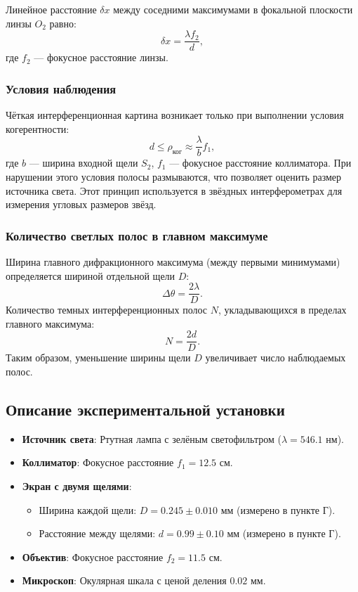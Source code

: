 Линейное расстояние $\delta x$ между соседними максимумами в фокальной плоскости линзы $O_2$ равно:  
\[
\delta x = \frac{\lambda f_2}{d},
\]  
где $f_2$ — фокусное расстояние линзы.  

\subsubsection*{Условия наблюдения}  
Чёткая интерференционная картина возникает только при выполнении условия когерентности:  
\[
d \leq \rho_{\text{ког}} \approx \frac{\lambda}{b} f_1,
\]  
где $b$ — ширина входной щели $S_2$, $f_1$ — фокусное расстояние коллиматора. При нарушении этого условия полосы размываются, что позволяет оценить размер источника света. Этот принцип используется в звёздных интерферометрах для измерения угловых размеров звёзд.  

\subsubsection*{Количество светлых полос в главном максимуме}  
Ширина главного дифракционного максимума (между первыми минимумами) определяется шириной отдельной щели $D$:  
\[
\Delta \theta = \frac{2\lambda}{D}.
\]  
Количество темных интерференционных полос $N$, укладывающихся в пределах главного максимума:  
\[
N = \frac{2d}{D}.
\]  
Таким образом, уменьшение ширины щели $D$ увеличивает число наблюдаемых полос.  

\subsection{Описание экспериментальной установки}  
\begin{itemize}  
    \item \textbf{Источник света}: Ртутная лампа с зелёным светофильтром ($\lambda = 546.1$ нм).  
    \item \textbf{Коллиматор}: Фокусное расстояние $f_1 = 12.5$ см.  
    \item \textbf{Экран с двумя щелями}:  
        \begin{itemize}  
            \item Ширина каждой щели: $D = 0.245 \pm 0.010$ мм (измерено в пункте Г).  
            \item Расстояние между щелями: $d = 0.99 \pm 0.10$ мм (измерено в пункте Г).  
        \end{itemize}  
    \item \textbf{Объектив}: Фокусное расстояние $f_2 = 11.5$ см.  
    \item \textbf{Микроскоп}: Окулярная шкала с ценой деления $0.02$ мм.  
\end{itemize}  

